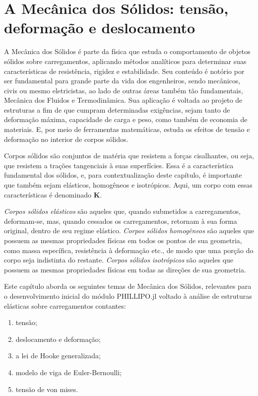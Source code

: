 \chapter{A Mecânica dos Sólidos: tensão, deformação e deslocamento}

A Mecânica dos Sólidos é parte da física que estuda o comportamento de objetos sólidos sobre carregamentos, aplicando métodos analíticos para determinar suas características de resistência, rigidez e estabilidade. Seu conteúdo é notório por ser fundamental para grande parte da vida dos engenheiros, sendo mecânicos, civis ou mesmo eletricistas, ao lado de outras áreas também tão fundamentais, Mecânica dos Fluidos e Termodinâmica. Sua aplicação é voltada ao projeto de estruturas a fim de que cumpram determinadas exigências, sejam tanto de deformação máxima, capacidade de carga e peso, como também de economia de materiais. E, por meio de ferramentas matemáticas, estuda os efeitos de tensão e deformação no interior de corpos sólidos. \cite{popov}

Corpos sólidos são conjuntos de matéria que resistem a forças cisalhantes, ou seja, que resistem a trações tangenciais à suas superfícies. Essa é a característica fundamental dos sólidos, e, para contextualização deste capítulo, é importante que também sejam elásticos, homogêneos e isotrópicos. Aqui, um corpo com essas características é denominado $\bm{K}$.

\emph{Corpos sólidos elásticos} são aqueles que, quando submetidos a carregamentos, deformam-se, mas, quando cessados os carregamentos, retornam à sua forma original, dentro de seu regime elástico. \emph{Corpos sólidos homogêneos} são aqueles que possuem as mesmas propriedades físicas em todos os pontos de sua geometria, como massa específica, resistência à deformação etc., de modo que uma porção do corpo seja indistinta do restante. \emph{Corpos sólidos isotrópicos} são aqueles que possuem as mesmas propriedades físicas em todas as direções de sua geometria.

Este capítulo aborda os seguintes temas de Mecânica dos Sólidos, relevantes para o desenvolvimento inicial do módulo PHILLIPO.jl voltado à análise de estruturas elásticas sobre carregamentos contantes:
\begin{enumerate}
    \item tensão;
    \item deslocamento e deformação;
    \item a lei de Hooke generalizada;
    \item modelo de viga de Euler-Bernoulli;
    \item tensão de von mises.
\end{enumerate}


